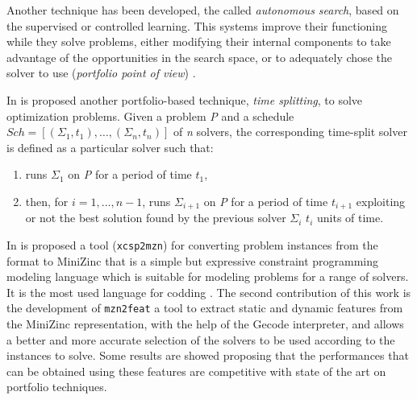 Another technique has been developed, the called {\it autonomous search}, based on the supervised or controlled learning. This systems improve their functioning while they solve problems, either  modifying their internal components to take advantage of the opportunities in the search space, or to adequately chose the solver to use ({\it portfolio point of view}) \cite{WhatIsAuto}.

In \cite{Amadini2014} is proposed another portfolio-based technique, \textit{time splitting}, to solve optimization problems. Given a problem \textit{P} and a schedule $Sch = \left[(\Sigma_1, t_1),\dots,(\Sigma_n, t_n)\right]$ of \textit{n} solvers, the corresponding time-split solver is defined as a particular solver such that:  
\begin{enumerate}[label=\alph*)]
\item runs $\Sigma_1$ on \textit{P} for a period of time $t_1$, 
\item then, for $i = 1,\dots, n-1$, runs $\Sigma_{i+1}$ on \textit{P} for a period of time $t_{i+1}$ exploiting or not the best solution found by the previous solver $\Sigma_i$ $t_i$ units of time.
\end{enumerate}




In \cite{Amadini} is proposed a tool (\texttt{xcsp2mzn}) for converting problem instances from the format  \cite{Committee} to {\sc MiniZinc} that is a simple but expressive constraint programming modeling language which is suitable for modeling problems for a range of solvers. It is the most used language for codding \csps{} \cite{Nethercote}. The second contribution of this work is the development of \texttt{mzn2feat} a tool to extract static and dynamic features from the {\sc MiniZinc} representation, with the help of the {\sc Gecode} interpreter, and allows a better and more accurate selection of the solvers to be used according to the instances to solve. Some results are showed proposing that the performances that can be obtained using these features are competitive with state of the art on \csp{} portfolio techniques. 

